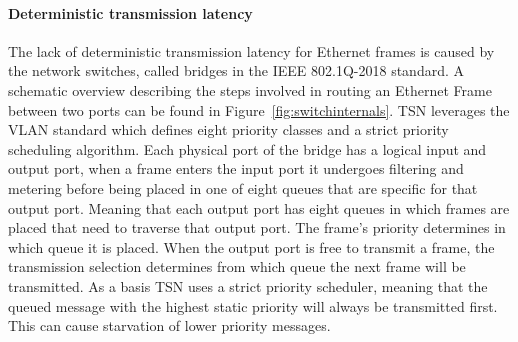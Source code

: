 \paragraph{Deterministic transmission latency} The lack of deterministic transmission latency for Ethernet frames is caused by the network switches, called bridges in the IEEE 802.1Q-2018 standard. A schematic overview describing the steps involved in routing an Ethernet Frame between two ports can be found in Figure~\ref{fig:switchinternals}. TSN leverages the VLAN standard which defines eight priority classes and a strict priority scheduling algorithm. Each physical port of the bridge has a logical input and output port, when a frame enters the input port it undergoes filtering and metering before being placed in one of eight queues that are specific for that output port. Meaning that each output port has eight queues in which frames are placed that need to traverse that output port. The frame's priority determines in which queue it is placed. When the output port is free to transmit a frame, the transmission selection determines from which queue the next frame will be transmitted. As a basis TSN uses a strict priority scheduler, meaning that the queued message with the highest static priority will always be transmitted first. This can cause starvation of lower priority messages.

